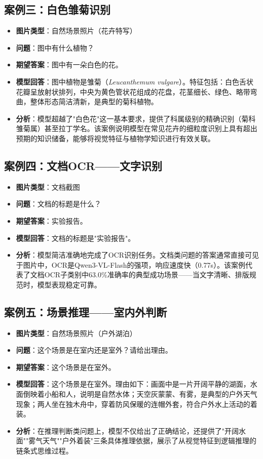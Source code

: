 \subsection{案例三：白色雏菊识别}

\begin{itemize}
  \item \textbf{图片类型}：自然场景照片（花卉特写）
  \item \textbf{问题}：图中有什么植物？
  \item \textbf{期望答案}：图中有一朵白色的花。
  \item \textbf{模型回答}：图中植物是雏菊（\textit{Leucanthemum vulgare}）。特征包括：白色舌状花瓣呈放射状排列，中央为黄色管状花组成的花盘，花茎细长、绿色、略带弯曲，整体形态简洁清新，是典型的菊科植物。
  \item \textbf{分析}：模型超越了"白色花"这一基本要求，提供了科属级别的精确识别（菊科雏菊属）甚至拉丁学名。该案例说明模型在常见花卉的细粒度识别上具有超出预期的知识储备，能够将视觉特征与植物学知识进行有效关联。
\end{itemize}

\subsection{案例四：文档OCR——文字识别}

\begin{itemize}
  \item \textbf{图片类型}：文档截图
  \item \textbf{问题}：文档的标题是什么？
  \item \textbf{期望答案}：实验报告。
  \item \textbf{模型回答}：文档的标题是"实验报告"。
  \item \textbf{分析}：模型简洁准确地完成了OCR识别任务。文档类问题的答案通常直接可见于图片中，OCR是Qwen3-VL-Flash的强项，响应速度快（0.77s）。该案例代表了文档OCR子类别中63.0\%准确率的典型成功场景——当文字清晰、排版规范时，模型表现稳定可靠。
\end{itemize}

\subsection{案例五：场景推理——室内外判断}

\begin{itemize}
  \item \textbf{图片类型}：自然场景照片（户外湖泊）
  \item \textbf{问题}：这个场景是在室内还是室外？请给出理由。
  \item \textbf{期望答案}：这个场景是在室外。
  \item \textbf{模型回答}：这个场景是在室外。理由如下：画面中是一片开阔平静的湖面，水面倒映着小船和人，说明是自然水体；天空灰蒙蒙、有雾，是典型的户外天气现象；两人坐在独木舟中，穿着防风保暖的连帽外套，符合户外水上活动的着装。
  \item \textbf{分析}：在推理判断类问题上，模型不仅给出了正确结论，还提供了"开阔水面""雾气天气""户外着装"三条具体推理依据，展示了从视觉特征到逻辑推理的链条式思维过程。
\end{itemize}

